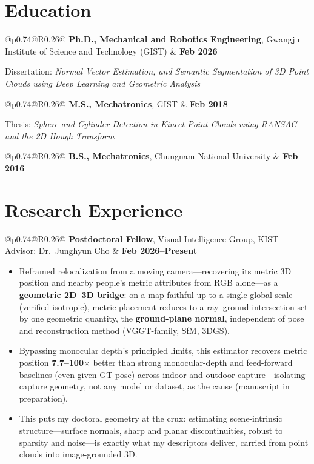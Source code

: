 \documentclass[10pt,a4paper]{article}
\makeatletter
\newcommand{\cvheader}[2]{%
	\begin{tabular*}{\textwidth}{@{}p{0.74\textwidth}@{\extracolsep{\fill}}R{0.26\textwidth}@{}}
		#1 & #2 \\
	\end{tabular*}%
}
\makeatother
\begin{document}
	\section*{Education}
	\cvheader{\textbf{Ph.D., Mechanical and Robotics Engineering}, Gwangju Institute of Science and Technology (GIST)}{\textbf{Feb 2026}}\par
	\vspace{0.2mm}
	{\small\hspace{1.8em}Dissertation: \textit{Normal Vector Estimation, and Semantic Segmentation of 3D Point Clouds using Deep Learning and Geometric Analysis}\par}
	\vspace{1.4mm}
	\cvheader{\textbf{M.S., Mechatronics}, GIST}{\textbf{Feb 2018}}\par
	\vspace{0.2mm}
	{\small\hspace{1.8em}Thesis: \textit{Sphere and Cylinder Detection in Kinect Point Clouds using RANSAC and the 2D Hough Transform}\par}
	\vspace{1.4mm}
	\cvheader{\textbf{B.S., Mechatronics}, Chungnam National University}{\textbf{Feb 2016}}\par
	
	\section*{Research Experience}
	\cvheader{\textbf{Postdoctoral Fellow}, Visual Intelligence Group, KIST \textbar{} Advisor: Dr.\ Junghyun Cho}{\textbf{Feb 2026--Present}}
	\begin{itemize}[leftmargin=1.8em]
		\item Reframed relocalization from a moving camera---recovering its metric 3D position and nearby people's metric attributes from RGB alone---as a \textbf{geometric 2D--3D bridge}: on a map faithful up to a single global scale (verified isotropic), metric placement reduces to a ray--ground intersection set by one geometric quantity, the \textbf{ground-plane normal}, independent of pose and reconstruction method (VGGT-family, SfM, 3DGS).
		
		\item Bypassing monocular depth's principled limits, this estimator recovers metric position \textbf{7.7--100$\times$} better than strong monocular-depth and feed-forward baselines (even given GT pose) across indoor and outdoor capture---isolating capture geometry, not any model or dataset, as the cause (manuscript in preparation).
		
		\item This puts my doctoral geometry at the crux: estimating scene-intrinsic structure---surface normals, sharp and planar discontinuities, robust to sparsity and noise---is exactly what my descriptors deliver, carried from point clouds into image-grounded 3D.
	\end{itemize}
	
\end{document}

